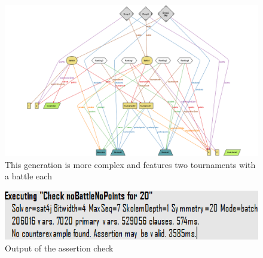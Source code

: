 \documentclass[12pt, a4paper]{report}
\begin{document}
    \begin{figure}[H]
        \centering
        \includegraphics[width=0.8\linewidth]{images/alloyGen1.png}
        \caption{This generation is more complex and features two tournaments with a battle each}
    \end{figure}
    \begin{figure}[H]
        \centering
        \includegraphics[width=0.5\linewidth]{images/marta.png}
        \caption{Output of the assertion check}
    \end{figure}
\end{document}
